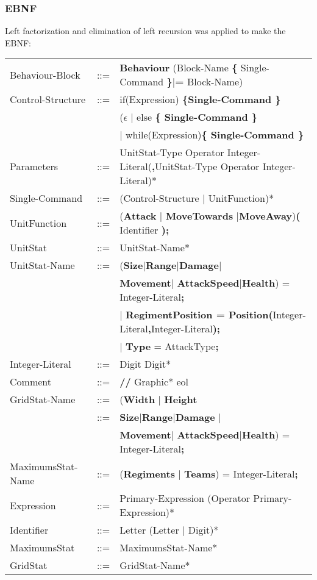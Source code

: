 	\subsubsection{EBNF}
		Left factorization and elimination of left recursion was applied to make the EBNF: \\
		\begin{center}
			\begin{tabular}{ l l l }
				Behaviour-Block	   &	::=	 & {\bf Behaviour} (Block-Name {\bf \{} Single-Command {\bf \}}$\mid${\bf = } Block-Name)   \\
				Control-Structure  &  	::=  & if(Expression) \bf{\{}Single-Command \bf{\}}  \\
								   &  	     & ($\epsilon$ $\mid$ else \bf{\{ }Single-Command \bf{\} } \\					   
								   &   		 & $\mid$ while(Expression)\bf{\{ } Single-Command \bf{\}} \\
				Parameters		   &	::=	 & UnitStat-Type Operator Integer-Literal({\bf ,}UnitStat-Type Operator Integer-Literal)* \\
				Single-Command     &	::=  & (Control-Structure $\mid$ UnitFunction)*    				  \\		
				UnitFunction	   &	::=	 & ({\bf Attack} $\mid$ {\bf MoveTowards} $\mid${\bf MoveAway}){\bf (} Identifier {\bf );} \\
		  		UnitStat		   &	::=  & UnitStat-Name*   		  \\
		  		UnitStat-Name	   &	::=	 & ({\bf Size}$\mid${\bf  Range}$\mid${\bf Damage}$\mid$\\
		  						   &    	 &	{\bf Movement}$\mid$ {\bf AttackSpeed}$\mid${\bf Health}) = Integer-Literal{\bf ;} \\ 
								   &	     & $\mid$ {\bf RegimentPosition = Position(}Integer-Literal{\bf ,}Integer-Literal{\bf );} \\
								   &		 & $\mid$ {\bf Type} = AttackType{\bf ;}	     											\\
				Integer-Literal    &	::=  & Digit Digit* \\
				Comment			   &    ::=  & {\bf //} Graphic* eol \\
				GridStat-Name	   &	::=  & ({\bf Width} $\mid$ {\bf Height} \\
									&	::=	 & {\bf Size}$\mid${\bf Range}$\mid${\bf Damage} $\mid$\\
		  						   &    	 & {\bf Movement}$\mid$ {\bf AttackSpeed}$\mid${\bf Health}) = Integer-Literal{\bf ;} \\ 
				MaximumsStat-Name  &	::=  & ({\bf Regiments }$\mid$ {\bf Teams}) =  Integer-Literal{\bf ;} \\
				Expression 		   &	::=	 & Primary-Expression (Operator Primary-Expression)* \\		
				Identifier 		   &    ::=  & Letter (Letter $\mid$ Digit)* \\
				MaximumsStat	   &	::=  & MaximumsStat-Name* \\
				GridStat		   &	::=  & GridStat-Name*  		\\			
			\end{tabular}
		\end{center}					     